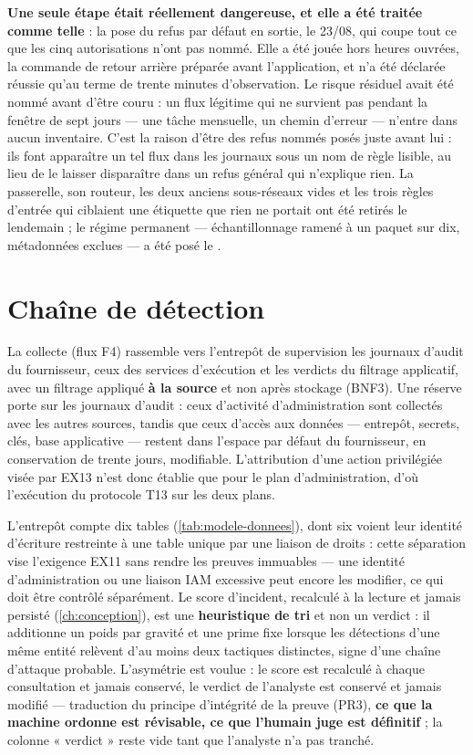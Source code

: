 \textbf{Une seule étape était réellement dangereuse, et elle a été traitée comme telle} : la pose
du refus par défaut en sortie, le 23/08, qui coupe tout ce que les cinq autorisations n'ont pas
nommé. Elle a été jouée hors heures ouvrées, la commande de retour arrière préparée avant
l'application, et n'a été déclarée réussie qu'au terme de trente minutes d'observation. Le risque
résiduel avait été nommé avant d'être couru : un flux légitime qui ne survient pas pendant la
fenêtre de sept jours --- une tâche mensuelle, un chemin d'erreur --- n'entre dans aucun
inventaire. C'est la raison d'être des refus nommés posés juste avant lui : ils font apparaître un
tel flux dans les journaux sous un nom de règle lisible, au lieu de le laisser disparaître dans un
refus général qui n'explique rien. La passerelle, son routeur, les deux anciens sous-réseaux vides
et les trois règles d'entrée qui ciblaient une étiquette que rien ne portait ont été retirés le
lendemain ; le régime permanent --- échantillonnage ramené à un paquet sur dix, métadonnées
exclues --- a été posé le \dateref.

\section{Chaîne de détection}
\label{sec:chaine-detection}

La collecte (flux F4) rassemble vers l'entrepôt de supervision les journaux d'audit du fournisseur,
ceux des services d'exécution et les verdicts du filtrage applicatif, avec un filtrage appliqué
\textbf{à la source} et non après stockage (BNF3). Une réserve porte sur les journaux d'audit : ceux
d'activité d'administration sont collectés avec les autres sources, tandis que ceux d'accès aux
données --- entrepôt, secrets, clés, base applicative --- restent dans l'espace par défaut du
fournisseur, en conservation de trente jours, modifiable. L'attribution d'une action privilégiée
visée par EX13 n'est donc établie que pour le plan d'administration, d'où l'exécution du protocole
T13 sur les deux plans.

L'entrepôt compte dix tables (\cref{tab:modele-donnees}), dont six voient leur identité d'écriture
restreinte à une table unique par une liaison de droits : cette séparation vise l'exigence EX11 sans
rendre les preuves immuables --- une identité d'administration ou une liaison IAM excessive peut
encore les modifier, ce qui doit être contrôlé séparément. Le score d'incident, recalculé à la
lecture et jamais persisté (\cref{ch:conception}), est une \textbf{heuristique de tri} et non un verdict : il
additionne un poids par gravité et une prime fixe lorsque les détections d'une même entité relèvent
d'au moins deux tactiques distinctes, signe d'une chaîne d'attaque probable. L'asymétrie est
voulue : le score est recalculé à chaque consultation et jamais conservé, le verdict de l'analyste
est conservé et jamais modifié --- traduction du principe d'intégrité de la preuve (PR3),
\textbf{ce que la machine ordonne est révisable, ce que l'humain juge est définitif} ; la colonne
« verdict » reste vide tant que l'analyste n'a pas tranché.


